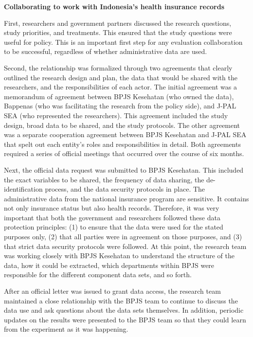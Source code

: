 \documentclass[
]{WileySix}
\begin{document}
\begin{bbox}
\begin{bbox}

\textbf{Collaborating to work with Indonesia's health insurance records}

First, researchers and government partners discussed the research questions, study priorities, and treatments. This ensured that the study questions were useful for policy. This is an important first step for any evaluation collaboration to be successful, regardless of whether administrative data are used.

Second, the relationship was formalized through two agreements that clearly outlined the research design and plan, the data that would be shared with the researchers, and the responsibilities of each actor. The initial agreement was a memorandum of agreement between BPJS Kesehatan (who owned the data), Bappenas (who was facilitating the research from the policy side), and J-PAL SEA (who represented the researchers). This agreement included the study design, broad data to be shared, and the study protocols. The other agreement was a separate cooperation agreement between BPJS Kesehatan and J-PAL SEA that spelt out each entity's roles and responsibilities in detail. Both agreements required a series of official meetings that occurred over the course of six months.

Next, the official data request was submitted to BPJS Kesehatan. This included the exact variables to be shared, the frequency of data sharing, the de-identification process, and the data security protocols in place. The administrative data from the national insurance program are sensitive. It contains not only insurance status but also health records. Therefore, it was very important that both the government and researchers followed these data protection principles: (1) to ensure that the data were used for the stated purposes only, (2) that all parties were in agreement on those purposes, and (3) that strict data security protocols were followed. At this point, the research team was working closely with BPJS Kesehatan to understand the structure of the data, how it could be extracted, which departments within BPJS were responsible for the different component data sets, and so forth.

After an official letter was issued to grant data access, the research team maintained a close relationship with the BPJS team to continue to discuss the data use and ask questions about the data sets themselves. In addition, periodic updates on the results were presented to the BPJS team so that they could learn from the experiment as it was happening.

\end{bbox}
\end{bbox}
\end{document}
